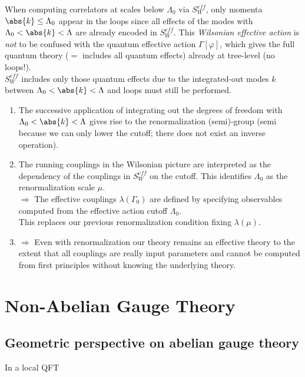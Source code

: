When computing correlators at scales below $\Lambda_0$ via $S^{eff}_W$, only momenta $\abs{k} \leq \Lambda_0$ appear in the loops since all effects of the modes with $\Lambda_0 < \abs{k} < \Lambda$ are already encoded in $S^{eff}_W$. This \emph{Wilsonian effective action} is \emph{not} to be confused with the quantum effective action $\Gamma[\varphi]$, which gives the full quantum theory ($=$ includes all quantum effects) already at tree-level (no loops!).\\
$S^{eff}_W$ includes only those quantum effects due to the integrated-out modes $k$ between $\Lambda_0 < \abs{k} < \Lambda$ and loops must still be performed.
\begin{enumerate}
	\item The successive application of integrating out the degrees of freedom with $\Lambda_0 < \abs{k} < \Lambda$ gives rise to the renormalization (semi)-group (semi because we can only lower the cutoff; there does not exist an inverse operation).
	\item The running couplings in the Wilsonian picture are interpreted as the dependency of the couplings in $S^{eff}_W$ on the cutoff. This identifies $\Lambda_0$ as the renormalization scale $\mu$. \\
	$\Rightarrow$ The effective couplings $\lambda(\Gamma_0)$ are defined by specifying observables computed from the effective action cutoff $\Lambda_0$.\\
	This replaces our previous renormalization condition fixing $\lambda(\mu)$.
	\item $\Rightarrow$ Even with renormalization our theory remains an effective theory to the extent that all couplings are really input parameters and cannot be computed from first principles without knowing the underlying theory.
\end{enumerate}






\section{Non-Abelian Gauge Theory}
\subsection{Geometric perspective on abelian gauge theory}
In a local QFT

















\newpage